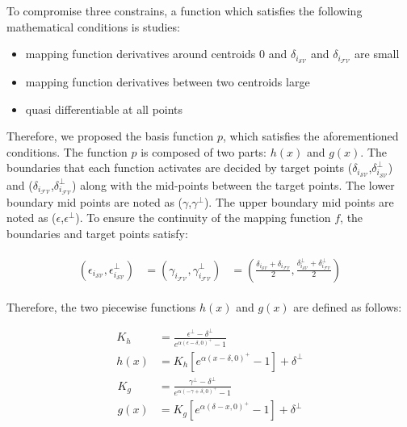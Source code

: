 To compromise three constrains, a function which satisfies the following mathematical conditions is studies:

\begin{itemize}
\item mapping function derivatives around centroids 0 and $\delta_{i_{{\mathcal{SV}}}}$ and $\delta_{i_{{\mathcal{FV}}}}$ are small
\item mapping function derivatives between two centroids large
\item quasi differentiable at all points
\end{itemize}

Therefore, we proposed the basis function $p$, which satisfies the aforementioned conditions. The function $p$ is composed of two parts: $h(x)$ and $g(x)$. The boundaries that each function activates are decided by target points ($\delta_{i_{{\mathcal{SV}}}}$,$\delta^{\perp}_{i_{{\mathcal{SV}}}}$) and ($\delta_{i_{{\mathcal{FV}}}}$,$\delta^{\perp}_{i_{{\mathcal{FV}}}}$) along with the mid-points between the target points. The lower boundary mid points are noted as ($\gamma$,$\gamma^{\perp}$). The upper boundary mid points are noted as ($\epsilon$,$\epsilon^{\perp}$). To ensure the continuity of the mapping function $f$, the boundaries and target points satisfy:

\begin{align}
\begin{aligned}
(\epsilon_{i_{{\mathcal{SV}}}},\epsilon^{\perp}_{i_{{\mathcal{SV}}}}) &=
(\gamma_{i_{{\mathcal{FV}}}},\gamma^{\perp}_{i_{{\mathcal{FV}}}}) &=
(\frac{\delta_{i_{{\mathcal{SV}}}} + \delta_{i_{{\mathcal{FV}}}}}{2}, \frac{\delta^{\perp}_{i_{{\mathcal{SV}}}} + \delta^{\perp}_{i_{{\mathcal{FV}}}}}{2})
\end{aligned}
\end{align}

Therefore, the two piecewise functions $h(x)$ and $g(x)$ are defined as follows:

\begin{align}
K_h &= \frac{\epsilon^{\perp}-\delta^{\perp}}{e^{\alpha(\epsilon-\delta,0)^{+}}-1}\\ \nonumber
h(x) &= K_h[e^{\alpha(x-\delta,0)^{+}}-1] + \delta^{\perp}
\end{align}
\begin{align}
K_g &= \frac{\gamma^{\perp}-\delta^{\perp}}{e^{\alpha(-\gamma+\delta,0)^{+}}-1}\\ \nonumber
g(x) &= K_g[e^{\alpha(\delta-x,0)^{+}}-1] + \delta^{\perp}
\end{align}

